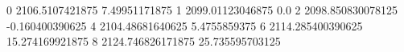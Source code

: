 0 2106.5107421875 7.49951171875
1 2099.01123046875 0.0
2 2098.850830078125 -0.160400390625
4 2104.48681640625 5.4755859375
6 2114.285400390625 15.274169921875
8 2124.746826171875 25.735595703125
